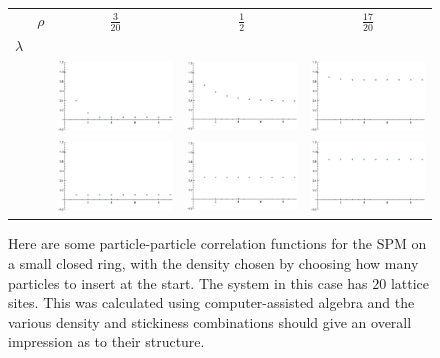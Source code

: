 \begin{figure}[h!]
\caption[Plots of the equal-time particle density correlation function on a ring.]{\label{fig:corrFns} Here are some particle-particle correlation functions for the SPM on a small closed ring,
with the density chosen by choosing how many particles to insert at the start. The system in this case has $20$ lattice sites.
This was calculated using computer-assisted algebra and the various density and stickiness combinations should give an overall impression as to their structure.}
\begin{center}
 \begin{tabular}{c  c | c | c | c}
  & $\rho$ & $\frac{3}{20}$ & $\frac{1}{2}$ & $\frac{17}{20}$ \\
  $\lambda$ & & & & \\
 \hline
    \raisebox{3 em}{ $\frac{1}{10}$ } & & \includegraphics[width=0.25\linewidth]{analytics/images/exactCorrFns/lowDensLowL}  & \includegraphics[width=0.25 \linewidth]{analytics/images/exactCorrFns/midDensLowL} & \includegraphics[width=0.25 \linewidth]{analytics/images/exactCorrFns/highDensLowL} \\
    \hline
    \raisebox{3 em}{ $1$ } & &    \includegraphics[width=0.25\linewidth]{analytics/images/exactCorrFns/lowDensMidL}  & \includegraphics[width=0.25 \linewidth]{analytics/images/exactCorrFns/midDensMidL} & \includegraphics[width=0.25 \linewidth]{analytics/images/exactCorrFns/highDensMidL} \\

\end{tabular}
\end{center}
\end{figure}
